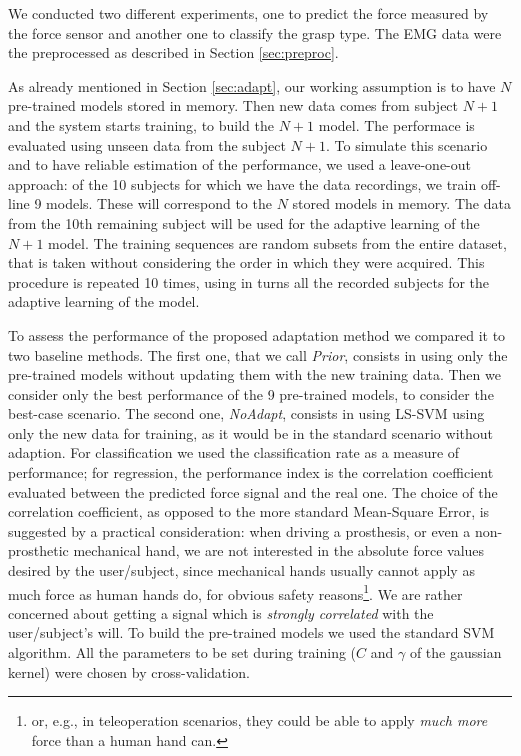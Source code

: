 We conducted two different experiments, one to predict the force measured
by the force sensor and another one to classify the grasp type.
The EMG data were the preprocessed as described in Section \ref{sec:preproc}.

As already mentioned in Section \ref{sec:adapt}, our working assumption is to have
 $N$ pre-trained models stored in memory.
Then new data comes from subject $N+1$ and the system starts
training, to build the $N+1$ model.
The performace is evaluated using unseen data from the subject
$N+1$.
To simulate this scenario and to have reliable estimation of the
performance, we used a leave-one-out approach: 
of the 10 subjects for which we have the data recordings, we train off-line
9 models. These will correspond to the $N$ stored models in memory. The data from the 10th 
remaining subject will be used for the adaptive learning of the $N+1$ model.
The training sequences are random subsets from the entire dataset, that is taken without
considering the order in which they were acquired.
This procedure is repeated 10 times, using in turns all the recorded subjects
for the adaptive learning of the model.

To assess the performance of the proposed adaptation method we compared it
to two baseline methods. The first one, that we call \emph{Prior}, consists in
using only the pre-trained models without updating them with the new training data.
Then we consider only the best performance of the 9 pre-trained models, to consider
the best-case scenario.
The second one, \emph{NoAdapt}, consists in using LS-SVM using only the new data
for training, as it would be in the standard scenario without adaption.
For classification we used the classification rate as a measure of
performance; for regression, the performance index is the correlation coefficient
evaluated between the predicted force signal and the real one. The
choice of the correlation coefficient, as opposed to the more standard
Mean-Square Error, is suggested by a practical consideration: when
driving a prosthesis, or even a non-prosthetic mechanical hand, we are
not interested in the absolute force values desired by the
user/subject, since mechanical hands usually cannot apply as much
force as human hands do, for obvious safety reasons\footnote{or, e.g.,
in teleoperation scenarios, they could be able to apply \emph{much
more} force than a human hand can.}. We are rather concerned about
getting a signal which is \emph{strongly correlated} with the
user/subject's will.
To build the  pre-trained models we used the standard SVM algorithm. All the parameters to be set during %
training ($C$ and $\gamma$ of the gaussian kernel) were chosen by cross-validation.

